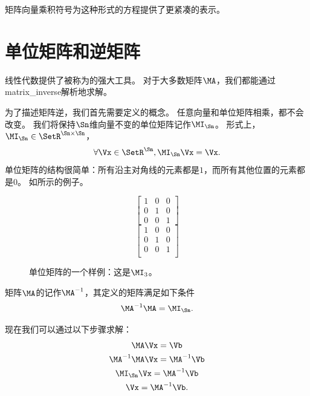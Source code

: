 矩阵向量乘积符号为这种形式的方程提供了更紧凑的表示。





\section{单位矩阵和逆矩阵}
\label{sec:identity_and_inverse_atrices}


线性代数提供了被称为的强大工具。
对于大多数矩阵$\MA$，我们都能通过\gls{matrix_inverse}解析地求解。


为了描述矩阵逆，我们首先需要定义的概念。
任意向量和单位矩阵相乘，都不会改变。
我们将保持$\Sn$维向量不变的单位矩阵记作$\MI_{\Sn}$。
形式上，$\MI_{\Sn}\in \SetR^{\Sn\times \Sn}$，
\begin{equation}
    \forall \Vx \in \SetR^{\Sn}, \MI_{\Sn} \Vx = \Vx.
\end{equation}
单位矩阵的结构很简单：所有沿主对角线的元素都是$1$，而所有其他位置的元素都是$0$。
如所示的例子。
\begin{figure}[!htb]
\ifOpenSource
\centering\begin{equation*}\begin{bmatrix}1&0&0\\0&1&0\\0&0&1\end{bmatrix}\end{equation*}
\else
\centering
\begin{equation*}
\begin{bmatrix} 
1 & 0 & 0 \\
0 & 1 & 0 \\
0 & 0 & 1 \\
\end{bmatrix}
\end{equation*}
\fi
\caption{单位矩阵的一个样例：这是$\MI_3$。}
\label{fig:chap2_empty2}
\end{figure}


矩阵$\MA$的记作$\MA^{-1}$，其定义的矩阵满足如下条件
\begin{equation} \MA^{-1}\MA = \MI_{\Sn}. \end{equation}

现在我们可以通过以下步骤求解：
\begin{gather}
\MA\Vx=\Vb \\
\MA^{-1}\MA\Vx = \MA^{-1}\Vb \\
\MI_{\Sn} \Vx=\MA^{-1}\Vb \\
\Vx=\MA^{-1}\Vb. 
\end{gather}


